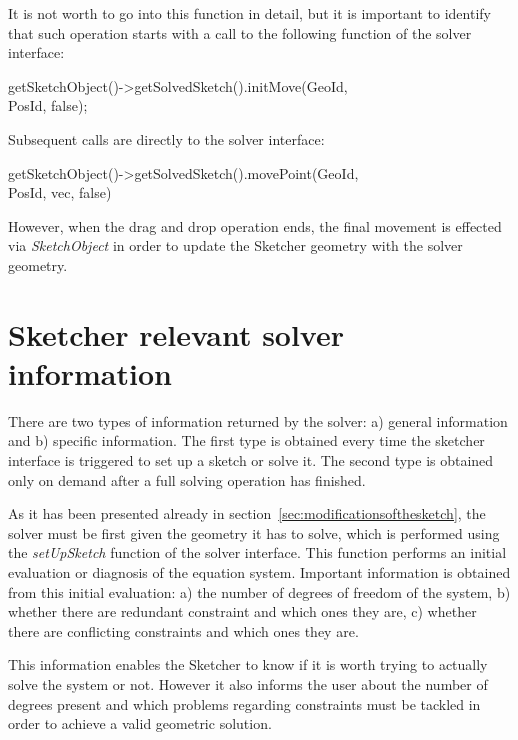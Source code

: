 \documentclass[12pt,twoside,a4paper]{book}
\begin{document}
    It is not worth to go into this function in detail, but it is important to identify that such operation starts with a call to the following function of the solver interface:

    \begin{codequote}
    getSketchObject()-\textgreater{}getSolvedSketch().initMove(GeoId, \\
    \-\hspace{4cm}PosId, false);
    \end{codequote}

    Subsequent calls are directly to the solver interface:

    \begin{codequote}
    getSketchObject()-\textgreater{}getSolvedSketch().movePoint(GeoId, \\
    \-\hspace{4cm}PosId, vec, false)
    \end{codequote}

    However, when the drag and drop operation ends, the final movement is effected via \emph{SketchObject} in order to update the Sketcher geometry with the solver geometry.

    \section{Sketcher relevant solver information}

    There are two types of information returned by the solver: a) general information and b) specific information. The first type is obtained every time the sketcher interface is triggered to set up a sketch or solve it. The second type is obtained only on demand after a full solving operation has finished.

    As it has been presented already in section~\ref{sec:modificationsofthesketch}, the solver must be first given the geometry it has to solve, which is performed using the \emph{setUpSketch} function of the solver interface. This function performs an initial evaluation or diagnosis of the equation system. Important information is obtained from this initial evaluation: a) the number of degrees of freedom of the system, b) whether there are redundant constraint and which ones they are, c) whether there are conflicting constraints and which ones they are.

    This information enables the Sketcher to know if it is worth trying to actually solve the system or not. However it also informs the user about the number of degrees present and which problems regarding constraints must be tackled in order to achieve a valid geometric solution.
\end{document}
